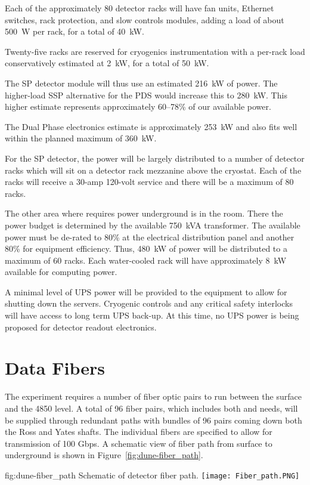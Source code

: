 Each of the approximately 80 detector racks will have fan units,
Ethernet switches, rack protection, and slow controls modules, adding
a load of about 500~W per rack, for a total of 40~kW.

Twenty-five racks are reserved for cryogenics instrumentation with a
per-rack load conservatively estimated at 2~kW, for a total of 50~kW.

The SP detector module will thus use an estimated 216~kW of power. The
higher-load SSP alternative for the PDS would increase this to
280~kW. This higher estimate represents approximately 60--78\% of
our available power.

The Dual Phase electronics estimate is
approximately 253~kW and also fits well within the planned maximum of
360~kW.

For the SP detector, the power will be largely distributed to a number
of detector racks which will sit on a detector rack mezzanine above
the cryostat.  Each of the racks will receive a 30-amp 120-volt
service and there will be a maximum of 80 racks.

The other area where  requires power underground is in the 
room.  There the power budget is determined by the available 750~kVA
transformer.  The available power must be de-rated to 80\% at
the electrical distribution panel and another 80\% for equipment
efficiency.  Thus, 480~kW of power will be distributed to a maximum of
60 racks.  Each water-cooled rack will have approximately 8~kW
available for computing power.

A minimal level of UPS power will be provided to the  equipment to
allow for shutting down the servers.  Cryogenic controls and any
critical safety interlocks will have access to long term UPS back-up.
At this time, no UPS power is being proposed for detector readout
electronics.


\section{Data Fibers}
\label{sec:fdsp-coord-faci-fibers}


The  experiment requires a number of fiber optic pairs to
run between the surface and the 4850 level.  A total of 96 fiber
pairs, which includes both  and  needs, will
be supplied through redundant paths with bundles of 96 pairs coming
down both the Ross and Yates shafts.  The individual fibers are
specified to allow for transmission of 100 Gbps.  A schematic view of
fiber path from surface to underground is shown in
Figure~\ref{fig:dune-fiber_path}.
\begin{dunefigure}{fig:dune-fiber_path}
  {Schematic of detector fiber path.}
  \texttt{[image: Fiber\_path.PNG]}
\end{dunefigure}

